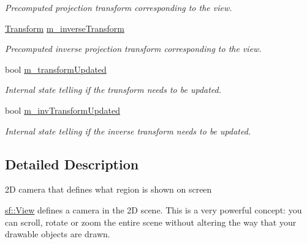 \begin{DoxyCompactItemize}
\begin{DoxyCompactList}\small\item\em Precomputed projection transform corresponding to the view. \end{DoxyCompactList}\item 
\mbox{\label{classsf_1_1_view_a2913d790e9dfb0e433ced3589be5182e}} 
\mbox{\hyperlink{classsf_1_1_transform}{Transform}} \mbox{\hyperlink{classsf_1_1_view_a2913d790e9dfb0e433ced3589be5182e}{m\+\_\+inverse\+Transform}}
\begin{DoxyCompactList}\small\item\em Precomputed inverse projection transform corresponding to the view. \end{DoxyCompactList}\item 
\mbox{\label{classsf_1_1_view_a64c4c557714b453d1e75b937e56eedd5}} 
bool \mbox{\hyperlink{classsf_1_1_view_a64c4c557714b453d1e75b937e56eedd5}{m\+\_\+transform\+Updated}}
\begin{DoxyCompactList}\small\item\em Internal state telling if the transform needs to be updated. \end{DoxyCompactList}\item 
\mbox{\label{classsf_1_1_view_a4fc36421401c03bd9c3f556023e891f7}} 
bool \mbox{\hyperlink{classsf_1_1_view_a4fc36421401c03bd9c3f556023e891f7}{m\+\_\+inv\+Transform\+Updated}}
\begin{DoxyCompactList}\small\item\em Internal state telling if the inverse transform needs to be updated. \end{DoxyCompactList}\end{DoxyCompactItemize}


\subsection{Detailed Description}
2D camera that defines what region is shown on screen 

\begin{DoxyVerb}\end{DoxyVerb}


\mbox{\hyperlink{classsf_1_1_view}{sf\+::\+View}} defines a camera in the 2D scene. This is a very powerful concept\+: you can scroll, rotate or zoom the entire scene without altering the way that your drawable objects are drawn.

